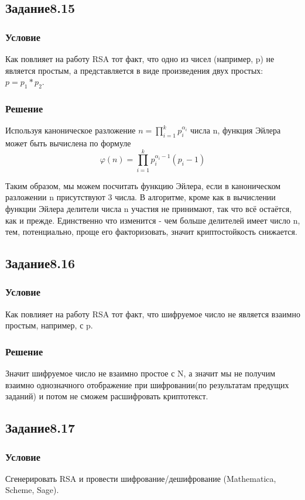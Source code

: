 \documentclass[10pt,a4paper]{article}
\begin{document}
\subsection*{Задание8.15}
\subsubsection*{Условие}
Как повлияет на работу RSA тот факт, что одно из чисел (например, p)
не является простым, а представляется в виде произведения двух
простых: $p=p_1*p_2$. 
\subsubsection*{Решение}
Используя каноническое разложение 
$ n = \prod_{i=1}^k p_i^{\alpha_i} $ числа n,
функция Эйлера может быть вычислена по формуле
$$  \varphi(n) = \prod_{i=1}^k p_i^{\alpha_i - 1} \left( p_i - 1 \right) $$

Таким образом, мы можем посчитать функцию Эйлера, если в каноническом
разложении n присутствуют 3 числа. В алгоритме, кроме как в вычислении
функции Эйлера делители числа n участия не принимают, так что всё
остаётся, как и прежде. Единственно что изменится - чем больше
делителей имеет число n, тем, потенциально, проще его факторизовать,
значит криптостойкость снижается.

\subsection*{Задание8.16}
\subsubsection*{Условие}
Как повлияет на работу RSA тот факт, что шифруемое число не является
взаимно простым, например, с p.
\subsubsection*{Решение}
Значит шифруемое число не взаимно простое с N, а значит мы не получим
взаимно однозначного отображение при шифровании(по результатам
предущих заданий) и потом не сможем
расшифровать криптотекст.

\subsection*{Задание8.17}
\subsubsection*{Условие}
Сгенерировать RSA и провести шифрование/дешифрование (Mathematica,
Scheme, Sage). 
\end{document}
